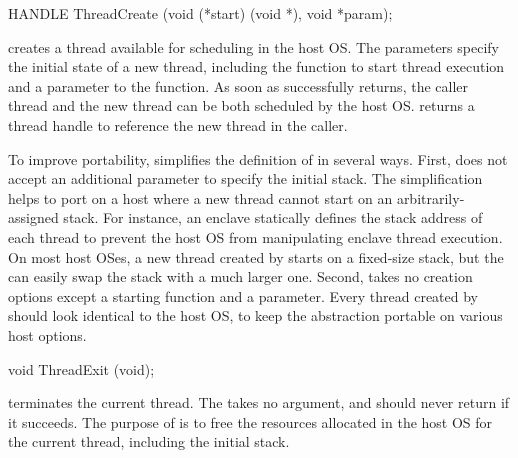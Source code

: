 \begin{paldef}
HANDLE ThreadCreate (void (*start) (void *), void *param);
\end{paldef}


 creates a thread available for scheduling in the host OS.
The parameters specify the initial state of a new thread, including the function to start thread execution and a parameter to the function.
As soon as  successfully returns,
the caller thread and the new thread can be both scheduled by the host OS. %
 returns a thread handle to reference the new thread in the caller.




To improve portability, \graphene{} simplifies
the definition of  in several ways.
First,  does not accept an additional parameter to specify the initial stack.
The simplification helps to port 
on a host where a new thread cannot start
on an arbitrarily-assigned stack.
For instance, an \sgx{} enclave statically defines the stack address of each thread
to prevent the host OS from manipulating
enclave thread execution.
On most host OSes, a new thread created by  starts on a fixed-size stack, but the \libos{} can easily swap the stack with a much larger one.
Second,  takes no creation options
except a starting function and a parameter.
Every thread created by  should look identical to the host OS,
to keep the abstraction portable
on various host options.



\begin{paldef}
void ThreadExit (void);
\end{paldef}

 terminates the current thread. The \hostapi{} takes no argument, and should never return if it succeeds.
The purpose of  is to free the resources allocated in the host OS
for the current thread, including the initial stack.






